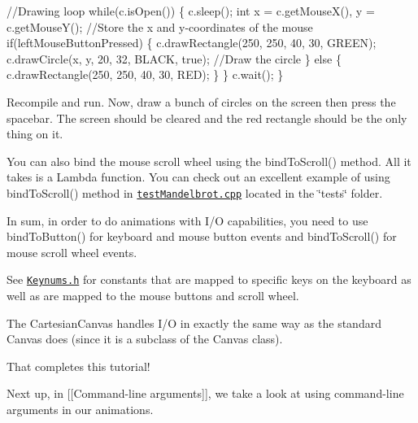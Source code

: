 \begin{DoxyCode}
  \textcolor{comment}{//Drawing loop}
  \textcolor{keywordflow}{while}(c.isOpen()) \{
    c.sleep();
    \textcolor{keywordtype}{int} x = c.getMouseX(), y = c.getMouseY();  \textcolor{comment}{//Store the x and y-coordinates of the mouse}
    \textcolor{keywordflow}{if}(leftMouseButtonPressed) \{
      c.drawRectangle(250, 250, 40, 30, GREEN);
      c.drawCircle(x, y, 20, 32, BLACK, \textcolor{keyword}{true});  \textcolor{comment}{//Draw the circle}
    \} \textcolor{keywordflow}{else} \{
      c.drawRectangle(250, 250, 40, 30, RED);
    \}
  \}
  c.wait();
\}
\end{DoxyCode}


Recompile and run. Now, draw a bunch of circles on the screen then press the spacebar. The screen should be cleared and the red rectangle should be the only thing on it.

You can also bind the mouse scroll wheel using the bind\+To\+Scroll() method. All it takes is a Lambda function. You can check out an excellent example of using bind\+To\+Scroll() method in \href{https://github.com/Calvin-CS/TSGL/blob/master/src/tests/testMandelbrot.cpp}{\tt test\+Mandelbrot.\+cpp} located in the \char`\"{}tests\char`\"{} folder.

In sum, in order to do animations with I/\+O capabilities, you need to use bind\+To\+Button() for keyboard and mouse button events and bind\+To\+Scroll() for mouse scroll wheel events.

See \href{http://calvin-cs.github.io/TSGL/html/_keynums_8h_source.html}{\tt Keynums.\+h} for constants that are mapped to specific keys on the keyboard as well as are mapped to the mouse buttons and scroll wheel.

The Cartesian\+Canvas handles I/\+O in exactly the same way as the standard Canvas does (since it is a subclass of the Canvas class).

That completes this tutorial!

Next up, in \mbox{[}\mbox{[}Command-\/line arguments\mbox{]}\mbox{]}, we take a look at using command-\/line arguments in our animations. 
